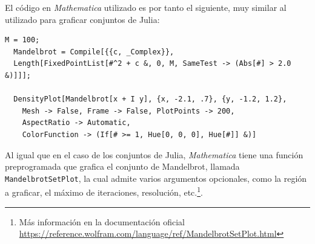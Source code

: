 El código en \textit{Mathematica} utilizado es por tanto el siguiente, muy similar al utilizado para graficar conjuntos de Julia:

\begin{lstlisting}[label=code:Mandelbrot, caption=Código que grafica el conjunto de Mandelbrot]
  M = 100; 
  Mandelbrot = Compile[{{c, _Complex}}, 
  Length[FixedPointList[#^2 + c &, 0, M, SameTest -> (Abs[#] > 2.0 &)]]];

  DensityPlot[Mandelbrot[x + I y], {x, -2.1, .7}, {y, -1.2, 1.2}, 
    Mesh -> False, Frame -> False, PlotPoints -> 200, 
    AspectRatio -> Automatic, 
    ColorFunction -> (If[# >= 1, Hue[0, 0, 0], Hue[#]] &)]

\end{lstlisting}

Al igual que en el caso de los conjuntos de Julia, \textit{Mathematica} tiene una función preprogramada que grafica el conjunto de Mandelbrot, llamada \verb|MandelbrotSetPlot|, la cual admite varios argumentos opcionales, como la región a graficar, el máximo de iteraciones, resolución, etc.\footnote{Más información en la documentación oficial \url{https://reference.wolfram.com/language/ref/MandelbrotSetPlot.html}}. 

